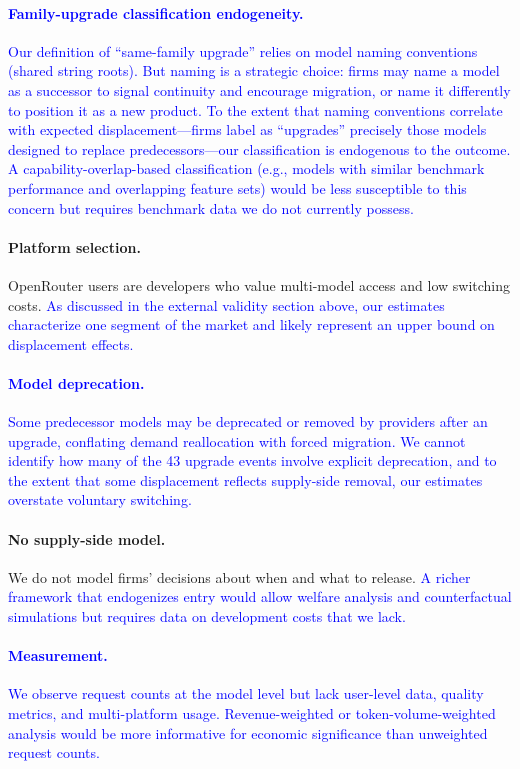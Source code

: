 \documentclass[11pt, a4paper]{article}
\begin{document}
\textcolor{blue}{\paragraph{Family-upgrade classification endogeneity.} Our definition of ``same-family upgrade'' relies on model naming conventions (shared string roots). But naming is a strategic choice: firms may name a model as a successor to signal continuity and encourage migration, or name it differently to position it as a new product. To the extent that naming conventions correlate with expected displacement---firms label as ``upgrades'' precisely those models designed to replace predecessors---our classification is endogenous to the outcome. A capability-overlap-based classification (e.g., models with similar benchmark performance and overlapping feature sets) would be less susceptible to this concern but requires benchmark data we do not currently possess.}

\paragraph{Platform selection.} OpenRouter users are developers who value multi-model access and low switching costs. \textcolor{blue}{As discussed in the external validity section above, our estimates characterize one segment of the market and likely represent an upper bound on displacement effects.}

\textcolor{blue}{\paragraph{Model deprecation.} Some predecessor models may be deprecated or removed by providers after an upgrade, conflating demand reallocation with forced migration. We cannot identify how many of the 43 upgrade events involve explicit deprecation, and to the extent that some displacement reflects supply-side removal, our estimates overstate voluntary switching.}

\paragraph{No supply-side model.} We do not model firms' decisions about when and what to release. \textcolor{blue}{A richer framework that endogenizes entry would allow welfare analysis and counterfactual simulations but requires data on development costs that we lack.}

\textcolor{blue}{\paragraph{Measurement.} We observe request counts at the model level but lack user-level data, quality metrics, and multi-platform usage. Revenue-weighted or token-volume-weighted analysis would be more informative for economic significance than unweighted request counts.}
\end{document}
